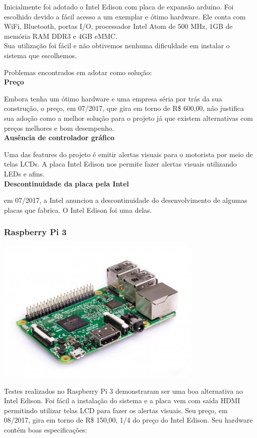 \documentclass[a4paper, 12pt]{article}
\begin{document}
Inicialmente foi adotado o Intel Edison com placa de expansão arduino. Foi escolhido devido a fácil acesso a um exemplar e ótimo hardware. Ele conta com WiFi, Bluetooth, portas I/O, processador Intel Atom de 500 MHz, 1GB de memória RAM DDR3 e 4GB eMMC. \\
Sua utilização foi fácil e não obtivemos nenhuma dificuldade em instalar o sistema que escolhemos.


Problemas encontrados em adotar como solução:
\\

\textbf{Preço}

Embora tenha um ótimo hardware e uma empresa séria por trás da sua construção, o preço, em 07/2017, que gira em torno de R\$ 600,00, não justifica sua adoção como a melhor solução para o projeto já que existem alternativas com preços melhores e bom desempenho.
\\

\textbf{Ausência de controlador gráfico}

Uma das features do projeto é emitir alertas visuais para o motorista por meio de telas LCDs. A placa Intel Edison nos permite fazer alertas visuais utilizando LEDs e afins. 
\\

\textbf{Descontinuidade da placa pela Intel}

em 07/2017, a Intel anunciou a descontinuidade do desenvolvimento de algumas placas que fabrica. O Intel Edison foi uma delas.

\subsubsection{Raspberry Pi 3}

\includegraphics[width=10cm, center]{images/raspberry-pi}

Testes realizados no Raspberry Pi 3 demonstraram ser uma boa alternativa ao Intel Edison. Foi fácil a instalação do sistema e a placa vem com saída HDMI permitindo utilizar telas LCD para fazer os alertas visuais.
Seu preço, em 08/2017, gira em torno de R\$ 150,00, 1/4 do preço do Intel Edison. Seu hardware contém boas especificações:
\end{document}
